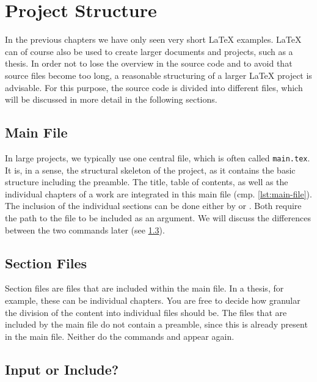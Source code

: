 \chapter{Project Structure}
\label{sec:project-structure}

In the previous chapters we have only seen very short \LaTeX{} examples. \LaTeX{} can of course also be used to create larger documents and projects, such as a thesis. 
In order not to lose the overview in the source code and to avoid that source files become too long, a reasonable structuring of a larger \LaTeX{} project is advisable. For this purpose, the source code is divided into different files, which will be discussed in more detail in the following sections.

\section{Main File}

In large projects, we typically use one central file, which is often called \texttt{main.tex}. It is, in a sense, the structural skeleton of the project, as it contains the basic structure including the preamble. The title, table of contents, as well as the individual chapters of a work are integrated in this main file (cmp. \cref{lst:main-file}). The inclusion of the individual sections can be done either by \texttt{} or \texttt{}. Both require the path to the file to be included as an argument. We will discuss the differences between the two commands later (see \cref{sec:input-vs-include}).


\section{Section Files}
Section files are files that are included within the main file. In a thesis, for example, these can be individual chapters. You are free to decide how granular the division of the content into individual files should be.
The files that are included by the main file do not contain a preamble, since this is already present in the main file. Neither do the commands \texttt{} and \texttt{} appear again.

\section{Input or Include?}
\label{sec:input-vs-include}

